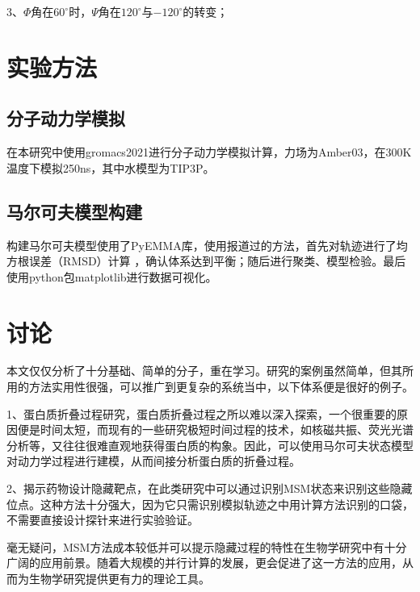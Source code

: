 \documentclass[a4paper]{article}
\begin{document}
\begin{CJK}{UTF8}{gbsn}
\begin{sloppypar}
	3、$\Phi$角在$60^{\circ}$时，$\Psi$角在$120^{\circ}$与$-120^{\circ}$的转变；





\section{实验方法}
	\subsection{分子动力学模拟}
在本研究中使用gromacs2021进行分子动力学模拟计算，力场为Amber03，在300K温度下模拟250ns，其中水模型为TIP3P。

	\subsection{马尔可夫模型构建}
构建马尔可夫模型使用了PyEMMA库，使用报道过的方法\cite{bowman2009progress}，首先对轨迹进行了均方根误差（RMSD）计算 ，确认体系达到平衡；随后进行聚类、模型检验。最后使用python包matplotlib进行数据可视化。


\section{讨论}

本文仅仅分析了十分基础、简单的分子，重在学习。研究的案例虽然简单，但其所用的方法实用性很强，可以推广到更复杂的系统当中，以下体系便是很好的例子。

1、蛋白质折叠过程研究，蛋白质折叠过程之所以难以深入探索，一个很重要的原因便是时间太短，而现有的一些研究极短时间过程的技术，如核磁共振、荧光光谱分析等，又往往很难直观地获得蛋白质的构象。因此，可以使用马尔可夫状态模型对动力学过程进行建模，从而间接分析蛋白质的折叠过程\cite{snow2005well}。


2、揭示药物设计隐藏靶点，在此类研究中可以通过识别MSM状态来识别这些隐藏位点。这种方法十分强大，因为它只需识别模拟轨迹之中用计算方法识别的口袋，不需要直接设计探针来进行实验验证\cite{bowman2012equilibrium}。

毫无疑问，MSM方法成本较低并可以提示隐藏过程的特性在生物学研究中有十分广阔的应用前景。随着大规模的并行计算的发展，更会促进了这一方法的应用，从而为生物学研究提供更有力的理论工具。
\end{sloppypar}
\end{CJK}



\end{document}
